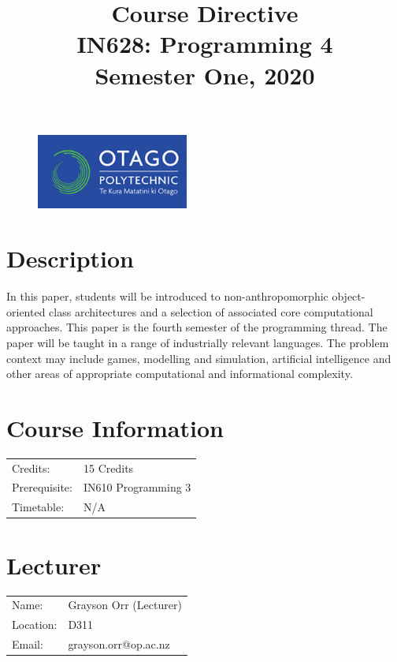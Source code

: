 \documentclass{article}
\author{}
\begin{document}
\begin{figure}
  \includegraphics[width=50mm]{../../resources/img/logo.png}
\end{figure}

\title{Course Directive\\IN628: Programming 4\\Semester One, 2020}
\date{}
\maketitle

\section*{Description}
In this paper, students will be introduced to non-anthropomorphic object-oriented class architectures and a selection of associated core computational approaches. This paper is the fourth semester of the programming thread. The paper will be taught in a range of industrially relevant languages. The problem context may include games, modelling and simulation, artificial intelligence and other areas of appropriate computational and informational complexity.

\section*{Course Information}
\begin{tabular}{ll}
  Credits:      & 15 Credits          \\
  Prerequisite: & IN610 Programming 3 \\
  Timetable:    & N/A                 \\
\end{tabular}

\section*{Lecturer}
\begin{tabular}{ll}
  Name:     & Grayson Orr (Lecturer) \\
  Location: & D311                   \\
  Email:    & grayson.orr@op.ac.nz   \\
\end{tabular}
\end{document}
